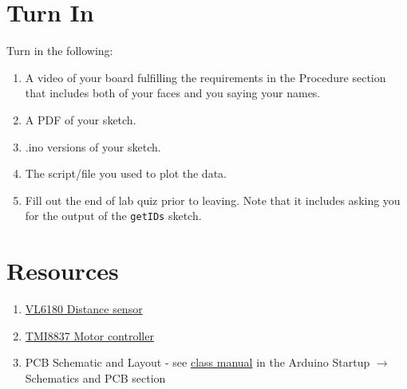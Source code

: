 \section{Turn In}
Turn in the following:
\begin{enumerate}
    \item A video of your board fulfilling the requirements in the Procedure section 
            that includes both of your faces and you saying your names.
    \item A PDF of your sketch.
    \item .ino versions of your sketch.
    \item The script/file you used to plot the data.
    \item Fill out the end of lab quiz prior to leaving. Note that it includes asking you 
            for the output of the \lstinline$getIDs$ sketch. 
\end{enumerate}

\section{Resources}\label{sec:distmotorservoresources}
\begin{enumerate}
    \item \href{https://www.st.com/resource/en/datasheet/vl6180.pdf}{VL6180 Distance sensor}
    \item \href{https://datasheet.lcsc.com/lcsc/2001060933_TMI-TMI8837_C478955.pdf}{TMI8837 Motor controller}
    \item PCB Schematic and Layout - see 
            \href{https://github.com/semcneil/Fundamentals-of-Microcontrollers-Manual}{class manual} 
            in the Arduino Startup $\rightarrow$ Schematics and PCB section
\end{enumerate}

